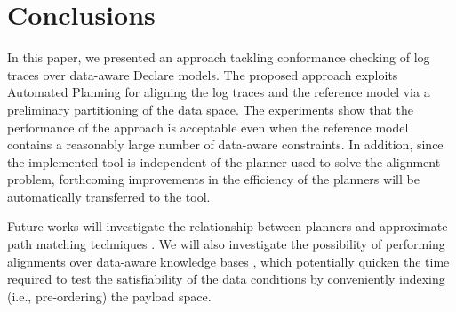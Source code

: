 \section{Conclusions}\label{sec:end}
In this paper, we presented an approach tackling conformance checking of log traces over data-aware Declare models. The proposed approach exploits Automated Planning for aligning the log traces and the reference model via a preliminary partitioning of the data space. The experiments show that the performance of the approach is acceptable even when the reference model contains a reasonably large number of data-aware constraints. In addition, since the implemented tool is independent of the planner used to solve the alignment problem, forthcoming improvements in the efficiency of the planners will be automatically transferred to the tool.
%


Future works will investigate the relationship between planners and approximate path matching techniques \cite{Myers1989}. We will also investigate the possibility of performing alignments over data-aware knowledge bases \cite{10.1007/978-3-319-39696-5_18}, which potentially quicken the time required to test the satisfiability of the data conditions by conveniently indexing (i.e., pre-ordering) the payload space. 
